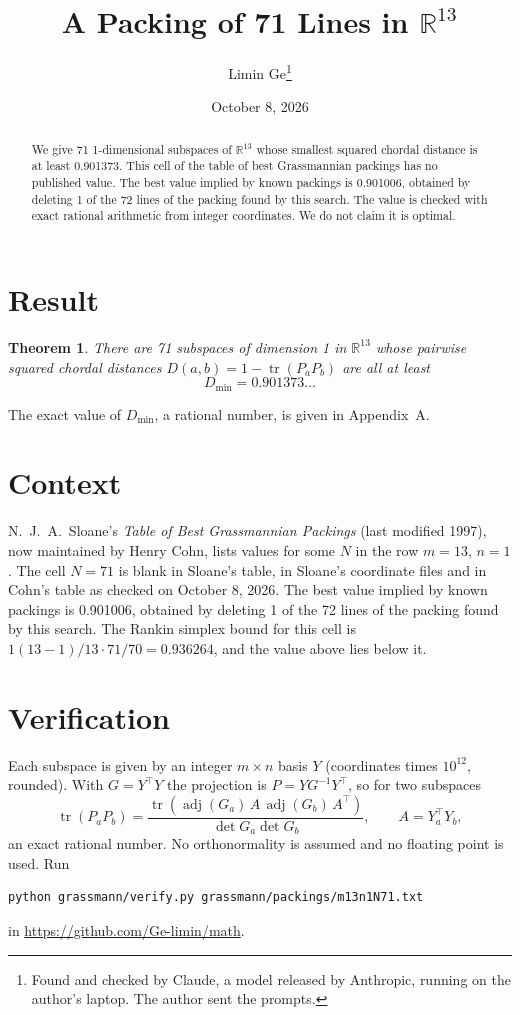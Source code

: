 \documentclass[11pt,a4paper]{article}
\title{A Packing of 71 Lines in $\mathbb{R}^{13}$}
\author{Limin Ge\thanks{Found and checked by Claude, a model released by Anthropic, running on the author's laptop. The author sent the prompts.}}
\date{October 8, 2026}
\newtheorem*{theorem}{Theorem}
\begin{document}
\maketitle
\begin{abstract}
We give 71 1-dimensional subspaces of $\mathbb{R}^{13}$ whose smallest squared chordal distance is at least 0.901373. This cell of the table of best Grassmannian packings has no published value. The best value implied by known packings is 0.901006, obtained by deleting 1 of the 72 lines of the packing found by this search. The value is checked with exact rational arithmetic from integer coordinates. We do not claim it is optimal.
\end{abstract}

\section{Result}
\begin{theorem}
There are 71 subspaces of dimension 1 in $\mathbb{R}^{13}$ whose pairwise squared chordal distances $D(a,b) = 1 - \operatorname{tr}(P_aP_b)$ are all at least
\[ D_{\min} = 0.901373\ldots \]
\end{theorem}
The exact value of $D_{\min}$, a rational number, is given in Appendix~A.


\section{Context}
N.~J.~A.~Sloane's \emph{Table of Best Grassmannian Packings} (last modified 1997), now maintained by Henry Cohn, lists values for some $N$ in the row $m=13$, $n=1$. The cell $N=71$ is blank in Sloane's table, in Sloane's coordinate files and in Cohn's table as checked on October 8, 2026. The best value implied by known packings is 0.901006, obtained by deleting 1 of the 72 lines of the packing found by this search. The Rankin simplex bound for this cell is $1(13-1)/13\cdot 71/70 = 0.936264$, and the value above lies below it.


\section{Verification}
Each subspace is given by an integer $m\times n$ basis $Y$ (coordinates times $10^{12}$, rounded). With $G=Y^\top Y$ the projection is $P=YG^{-1}Y^\top$, so for two subspaces
\[ \operatorname{tr}(P_aP_b)=\frac{\operatorname{tr}(\operatorname{adj}(G_a)\,A\,\operatorname{adj}(G_b)\,A^\top)}{\det G_a\det G_b},\qquad A=Y_a^\top Y_b, \]
an exact rational number. No orthonormality is assumed and no floating point is used. Run
\begin{verbatim}
python grassmann/verify.py grassmann/packings/m13n1N71.txt
\end{verbatim}
in \url{https://github.com/Ge-limin/math}.
\end{document}
